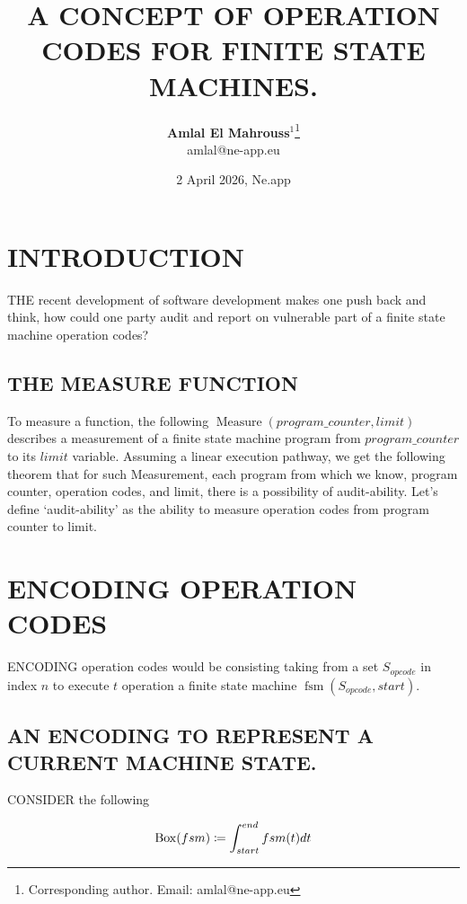 \documentclass[10pt, twocolumn]{article}
\title{%
  \vspace{-1.5em}%
  \large\textbf{A CONCEPT OF OPERATION CODES FOR FINITE STATE MACHINES.}%
}
\author{%
  \textbf{Amlal El Mahrouss}$^{1}$\thanks{Corresponding author. Email: amlal@ne-app.eu}
  \\amlal@ne-app.eu
}
\date{%
  \small 2 April 2026, Ne.app
}
\theoremstyle{plain}
\theoremstyle{definition}
\theoremstyle{remark}
\begin{document}

\twocolumn[{%
  \maketitle
  \vspace{-0.5em}
  \rule{\linewidth}{0.4pt}
  \vspace{1em}
}]

\section{INTRODUCTION}
\lettrine[lines=1,loversize=-.4]{T}{HE} recent development of software development makes one push back and think, how could one party audit and report on vulnerable part of a finite state machine operation codes?

\subsection{THE MEASURE FUNCTION}

To measure a function, the following $\operatorname{Measure}(program\_counter, limit)$ describes a measurement of a finite state machine program from $program\_counter$ to its $limit$ variable. Assuming a linear execution pathway, we get the following theorem that for such Measurement, each program from which we know, program counter, operation codes, and limit, there is a possibility of audit-ability. Let's define `audit-ability' as the ability to measure operation codes from program counter to limit.

\section{ENCODING OPERATION CODES}

\lettrine[lines=1,loversize=-.4]{E}{NCODING} operation codes would be consisting taking from a set $S_{opcode}$ in index $n$ to execute $t$ operation a finite state machine $\operatorname{fsm}(S_{opcode}, start)$. 

\subsection{AN ENCODING TO REPRESENT A CURRENT MACHINE STATE.}

\lettrine[lines=1,loversize=-.4]{C}{ONSIDER} the following 

\begin{equation}
    \operatorname{Box}(fsm) \coloneqq \int_{start}^{end} fsm(t) \space dt
\end{equation}
\end{document}
